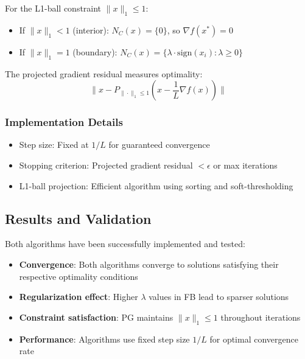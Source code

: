 \documentclass[11pt,a4paper]{article}
\begin{document}
For the L1-ball constraint $\|x\|_1 \leq 1$:
\begin{itemize}
    \item If $\|x\|_1 < 1$ (interior): $N_C(x) = \{0\}$, so $\nabla f(x^*) = 0$
    \item If $\|x\|_1 = 1$ (boundary): $N_C(x) = \{\lambda \cdot \text{sign}(x_i) : \lambda \geq 0\}$
\end{itemize}

The projected gradient residual measures optimality:
\[ \|x - P_{\|\cdot\|_1 \leq 1}(x - \frac{1}{L}\nabla f(x))\| \]

\subsubsection{Implementation Details}

\begin{itemize}
    \item Step size: Fixed at $1/L$ for guaranteed convergence
    \item Stopping criterion: Projected gradient residual $< \epsilon$ or max iterations
    \item L1-ball projection: Efficient algorithm using sorting and soft-thresholding
\end{itemize}

\subsection{Results and Validation}

Both algorithms have been successfully implemented and tested:
\begin{itemize}
    \item \textbf{Convergence}: Both algorithms converge to solutions satisfying their respective optimality conditions
    \item \textbf{Regularization effect}: Higher $\lambda$ values in FB lead to sparser solutions
    \item \textbf{Constraint satisfaction}: PG maintains $\|x\|_1 \leq 1$ throughout iterations
    \item \textbf{Performance}: Algorithms use fixed step size $1/L$ for optimal convergence rate
\end{itemize}
\end{document}

